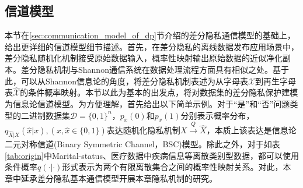 \subsection{信道模型}\label{chapter05-achieve-channel}

本节在\ref{sec:communication_model_of_dp}节介绍的差分隐私通信模型的基础上，给出更详细的信道模型细节描述。首先，在差分隐私的离线数据发布应用场景中，差分隐私随机化机制接受原始数据输入，概率性映射输出原始数据的近似净化副本。差分隐私机制与Shannon通信系统在数据处理流程方面具有相似之处。基于此，可以从Shannon信息论的角度，将差分隐私机制表述为从字母表$\mathcal{X}$到再生字母表$\mathcal{\hat{X}}$的条件概率映射。本节以此为基本的出发点，将对数据集的差分隐私保护建模为信息论信道模型。为方便理解，首先给出以下简单示例。对于``是''和``否''问题类型的二进制数据集$\mathcal{D}=\{0,1\}^{n}$，$p_x(0)$和$p_x(1)$分别表示概率分布，$q_{\hat{X}|X}(\hat{x}|x),(x,\hat{x}\in \{0,1\})$表达随机化隐私机制$X\xrightarrow{Q} \hat{X}$，本质上该表达是信息论二元对称信道(Binary Symmetric Channel，BSC)模型。除此之外，对于如表\ref{tab:origin}中Marital-status、医疗数据中疾病信息等离散类别型数据，都可以使用条件概率$q(\cdot|\cdot)$形式表示为两个有限离散集合之间的概率性映射关系。对此，本章中延承差分隐私基本通信模型开展本章隐私机制的研究。


